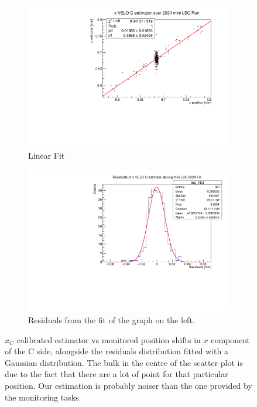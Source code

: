 \begin{figure}
    \centering
    \begin{subfigure}{0.48\textwidth}
    \includegraphics[width=\linewidth]{figures/xVeloC_fit_comparison.pdf}
    \caption{Linear Fit}\label{fig:xCfit_comparison}
    \end{subfigure}
    \begin{subfigure}{0.48\textwidth}
    \includegraphics[width=\linewidth]{figures/xVeloC_res_comparison.pdf}
    \caption{Residuals from the fit of the graph on the left. }\label{fig:xCres_comparison}
    \end{subfigure}
    \caption{$\hat{x}_{C}$ calibrated estimator vs monitored position shifts in $x$ component of the C side, alongside the residuals distribution fitted with a Gaussian distribution. The bulk in the centre of the scatter plot is due to the fact that there are a lot of point for that particular position. Our estimation is probably noiser than the one provided by the monitoring tasks.}
    \label{fig:xC_comaprison}
\end{figure}
